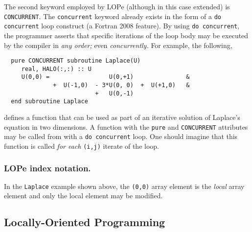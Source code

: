 The second keyword employed by LOPe (although in this case extended) is \texttt{CONCURRENT}.  The
\texttt{concurrent} keyword already exists in the form of a \texttt{do concurrent} loop construct (a
Fortran 2008 feature).  By using \texttt{do concurrent}, the programmer asserts that specific
iterations of the loop body may be executed by the compiler in \emph{any order;} even
\emph{concurrently.}  For example, the following,
\begin{verbatim}
  pure CONCURRENT subroutine Laplace(U)
     real, HALO(:,:) :: U
     U(0,0) =                 U(0,+1)               &
              +  U(-1,0)  - 3*U(0, 0)  +  U(+1,0)   &
                          +   U(0,-1)
  end subroutine Laplace
\end{verbatim}
defines a function that can be used as part of an iterative solution of Laplace's equation in two
dimensions.  A function with the \texttt{pure} and \texttt{CONCURRENT} attributes may be called from
with a \texttt{do concurrent} loop.  One should imagine that this function is called \emph{for each}
\texttt{(i,j)} iterate of the loop.

\subsubsection{LOPe index notation.}
In the \texttt{Laplace} example shown above, the \texttt{(0,0)} array element is the \emph{local} 
array element and only the local element may be modified.  





\subsection{Locally-Oriented Programming}


